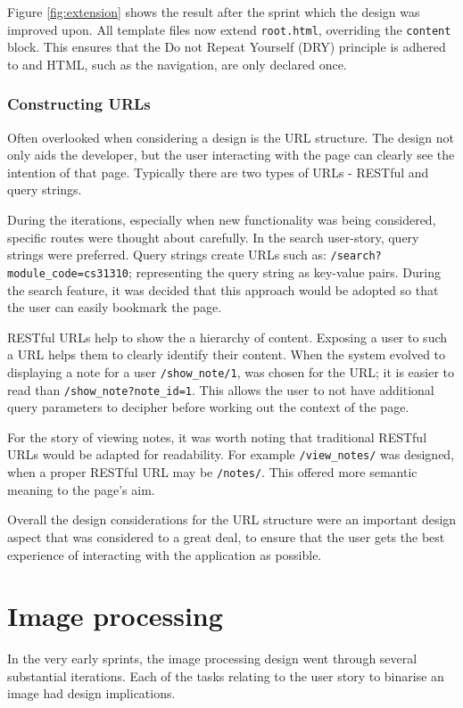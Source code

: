 Figure \ref{fig:extension} shows the result after the sprint which the design was improved upon. All template files now extend \texttt{root.html}, overriding the \texttt{content} block. This ensures that the Do not Repeat Yourself (DRY) principle is adhered to and HTML, such as the navigation, are only declared once.

\subsubsection{Constructing URLs} \label{design:urls}
Often overlooked when considering a design is the URL structure. The design not only aids the developer, but the user interacting with the page can clearly see the intention of that page. Typically there are two types of URLs - RESTful and query strings.

During the iterations, especially when new functionality was being considered, specific routes were thought about carefully. In the search user-story, query strings were preferred. Query strings create URLs such as: \texttt{/search?module\_code=cs31310}; representing the query string as key-value pairs. During the search feature, it was decided that this approach would be adopted so that the user can easily bookmark the page.

RESTful URLs help to show the a hierarchy of content. Exposing a user to such a URL helps them to clearly identify their content. When the system evolved to displaying a note for a user \texttt{/show\_note/1}, was chosen for the URL; it is easier to read than  \texttt{/show\_note?note\_id=1}. This allows the user to not have additional query parameters to decipher before working out the context of the page.

For the story of viewing notes, it was worth noting that traditional RESTful URLs would be adapted for readability. For example \texttt{/view\_notes/} was designed, when a proper RESTful URL may be \texttt{/notes/}. This offered more semantic meaning to the page's aim.

Overall the design considerations for the URL structure were an important design aspect that was considered to a great deal, to ensure that the user gets the best experience of interacting with the application as possible.

\section{Image processing}
In the very early sprints, the image processing design went through several substantial iterations. Each of the tasks relating to the user story to binarise an image had design implications.

